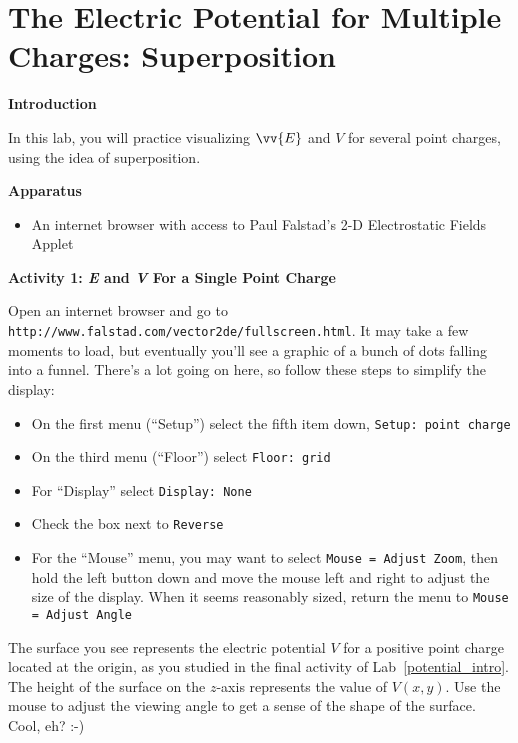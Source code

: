 \section{The Electric Potential for Multiple Charges: Superposition}
\label{potential_superposition}


\makelabheader %

\bigskip

\textbf{Introduction} 

In this lab, you will practice visualizing $\vv{E}$ and $V$ for several point charges, using the idea of superposition.

\textbf{Apparatus}

\begin{itemize}[nosep]
\item An internet browser with access to Paul Falstad's 2-D Electrostatic Fields Applet
\end{itemize}

\bigskip

\textbf{Activity 1: \textit{E} and \textit{V} For a Single Point Charge}

Open an internet browser and go to \verb!http://www.falstad.com/vector2de/fullscreen.html!.  It may take a few moments to load, but eventually you'll see a graphic of a bunch of dots falling into a funnel.  There's a lot going on here, so follow these steps to simplify the display:
\begin{itemize}[nosep]
\item On the first menu (``Setup'') select the fifth item down, \verb!Setup: point charge!
\item On the third menu (``Floor'') select \verb!Floor: grid!
\item For ``Display'' select \verb!Display: None!
\item Check the box next to \verb!Reverse!
\item For the ``Mouse'' menu, you may want to select \verb!Mouse = Adjust Zoom!, then hold the left button down and move the mouse left and right to adjust the size of the display.  When it seems reasonably sized, return the menu to \verb!Mouse = Adjust Angle!
\end{itemize}

The surface you see represents the electric potential $V$ for a positive point charge located at the origin, as you studied in the final activity of Lab~\ref{potential_intro}.  The height of the surface on the $z$-axis represents the value of $V(x,y)$.  Use the mouse to adjust the viewing angle to get a sense of the shape of the surface.  Cool, eh?  :-)

